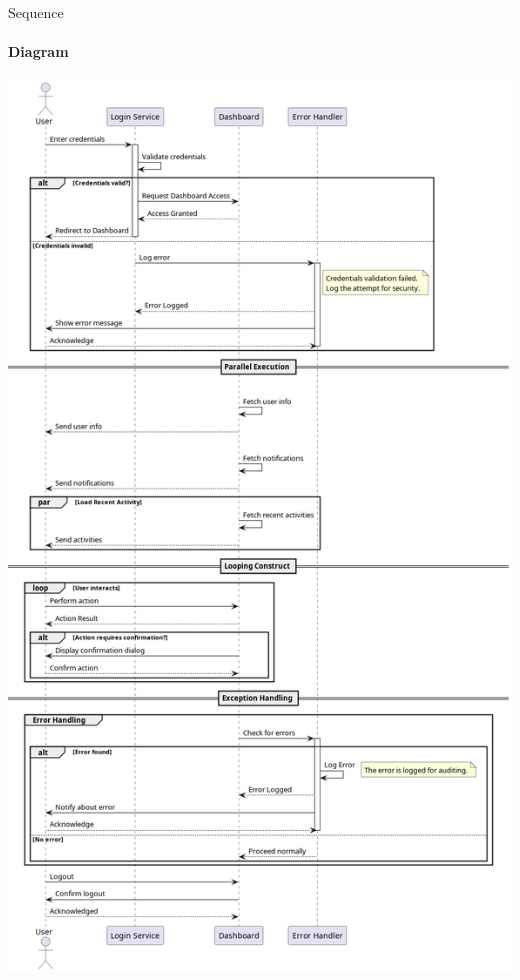 \documentclass[aspectratio=169, table]{beamer}
\begin{document}
\begin{frame}{Sequence}
	\framesubtitle{Diagram}
	\centering
	\includegraphics[width=\textwidth,height=0.97\textheight,keepaspectratio]{../../figures/out/sequence_diagram.png}
\end{frame}
\end{document}
